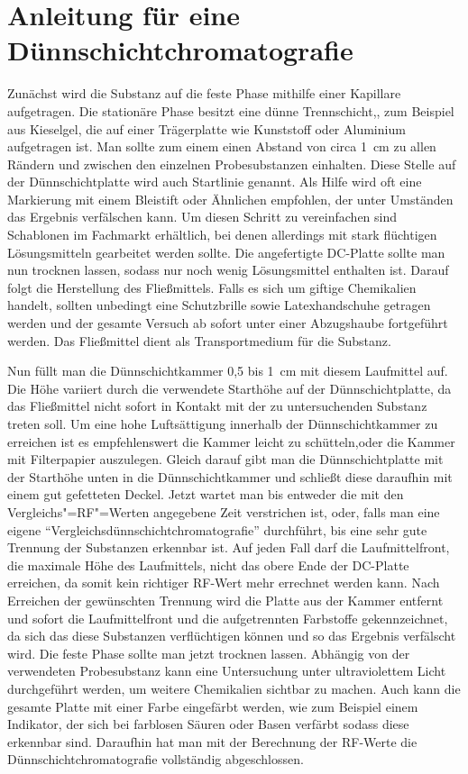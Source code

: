 \documentclass[11pt]{scrreprt}
\begin{document}
 \section{ Anleitung für eine  Dünnschichtchromatografie} 
 
 Zunächst wird die Substanz auf die feste Phase mithilfe einer Kapillare aufgetragen. Die stationäre Phase  besitzt eine dünne Trennschicht,, zum Beispiel aus Kieselgel,  die auf einer Trägerplatte wie Kunststoff oder Aluminium aufgetragen ist. Man sollte zum einem einen Abstand von circa \SI{1}{\centi\meter} zu allen Rändern und zwischen den einzelnen Probesubstanzen einhalten. Diese Stelle auf der Dünnschichtplatte wird auch Startlinie genannt. Als Hilfe wird oft eine Markierung mit einem Bleistift oder Ähnlichen empfohlen, der unter Umständen das Ergebnis verfälschen kann.  Um diesen Schritt zu vereinfachen sind Schablonen im Fachmarkt erhältlich, bei denen allerdings mit stark flüchtigen Lösungsmitteln gearbeitet werden sollte. Die angefertigte DC-Platte sollte man nun trocknen lassen, sodass nur noch wenig Lösungsmittel enthalten ist. Darauf folgt die Herstellung des Fließmittels. Falls es sich um giftige Chemikalien handelt, sollten unbedingt eine Schutzbrille sowie Latexhandschuhe getragen werden und der gesamte Versuch ab sofort unter einer Abzugshaube fortgeführt werden. Das Fließmittel dient als Transportmedium für die Substanz.
 
 Nun füllt man die Dünnschichtkammer 0,5 bis \SI{1}{\centi\meter} mit diesem Laufmittel auf. Die Höhe variiert durch die verwendete Starthöhe auf der Dünnschichtplatte, da das Fließmittel nicht sofort in Kontakt mit der zu untersuchenden Substanz treten soll. Um eine hohe Luftsättigung innerhalb der Dünnschichtkammer zu erreichen ist es empfehlenswert die Kammer leicht zu schütteln,oder die Kammer mit Filterpapier auszulegen. Gleich darauf gibt man die Dünnschichtplatte mit der Starthöhe unten in die Dünnschichtkammer und schließt diese daraufhin mit einem gut gefetteten Deckel. Jetzt wartet man bis entweder die mit den Vergleichs"=RF"=Werten angegebene Zeit verstrichen ist, oder, falls man eine eigene \enquote{Vergleichsdünnschichtchromatografie} durchführt, bis eine sehr gute Trennung der Substanzen erkennbar ist. Auf jeden Fall darf die Laufmittelfront, die maximale Höhe des Laufmittels, nicht das obere Ende der DC-Platte erreichen, da somit kein richtiger RF-Wert mehr errechnet werden kann. Nach Erreichen der gewünschten Trennung wird die Platte aus der Kammer entfernt und sofort die Laufmittelfront und die aufgetrennten Farbstoffe gekennzeichnet, da sich das diese Substanzen verflüchtigen können und so das Ergebnis verfälscht wird. 
 Die feste Phase sollte man jetzt trocknen lassen. Abhängig von der verwendeten Probesubstanz kann eine Untersuchung unter ultraviolettem Licht durchgeführt werden, um weitere Chemikalien sichtbar zu machen. Auch kann die gesamte Platte mit einer Farbe eingefärbt werden, wie zum Beispiel einem Indikator, der sich bei farblosen Säuren oder Basen verfärbt sodass diese  erkennbar sind. Daraufhin hat man mit der Berechnung der RF-Werte die Dünnschichtchromatografie vollständig abgeschlossen\cite[S.117-118]{Wittke,1984}.
\end{document}
